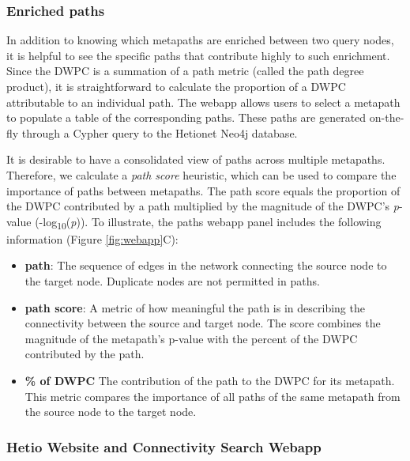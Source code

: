 \hypertarget{enriched-paths}{%
\subsubsection{Enriched paths}\label{enriched-paths}}

In addition to knowing which metapaths are enriched between two query nodes,
it is helpful to see the specific paths that contribute highly to such enrichment.
Since the DWPC is a summation of a path metric (called the path degree product),
it is straightforward to calculate the proportion of a DWPC attributable to an individual path.
The webapp allows users to select a metapath to populate a table of the corresponding paths.
These paths are generated on-the-fly through a Cypher query to the Hetionet Neo4j database.

It is desirable to have a consolidated view of paths across multiple metapaths.
Therefore, we calculate a \emph{path score} heuristic,
which can be used to compare the importance of paths between metapaths.
The path score equals the proportion of the DWPC contributed by a path multiplied by the magnitude of the DWPC's \emph{p}-value (-log\textsubscript{10}(\emph{p})).
To illustrate, the paths webapp panel includes the following information (Figure \ref{fig:webapp}C):

\begin{itemize}
\tightlist
\item
  \textbf{path}:
  The sequence of edges in the network connecting the source node to the target node.
  Duplicate nodes are not permitted in paths.
\item
  \textbf{path score}:
  A metric of how meaningful the path is in describing the connectivity between the source and target node.
  The score combines the magnitude of the metapath's p-value with the percent of the DWPC contributed by the path.
\item
  \textbf{\% of DWPC}
  The contribution of the path to the DWPC for its metapath.
  This metric compares the importance of all paths of the same metapath from the source node to the target node.
\end{itemize}

\hypertarget{hetio-website-and-connectivity-search-webapp}{%
\subsubsection{Hetio Website and Connectivity Search Webapp}\label{hetio-website-and-connectivity-search-webapp}}

